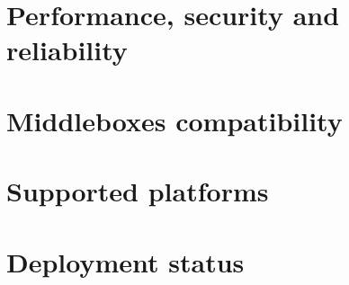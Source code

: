 \section{Performance, security and reliability} 
\section{Middleboxes compatibility}
\section{Supported platforms}
\section{Deployment status}
